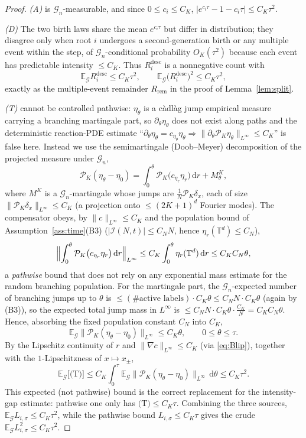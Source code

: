 \documentclass[a4paper,fleqn]{cas-sc}
\theoremstyle{definition}
\theoremstyle{remark}
\begin{document}
\begin{proof}
\emph{(A)} is $\mathcal G_n$-measurable, and since $0\le c_i\le C_K$,
$\bigl|e^{c_i\tau}-1-c_i\tau\bigr|\le C_K\tau^2$.

\emph{(D)} The two birth laws share the mean $e^{c_i\tau}$ but differ in
distribution; they disagree only when root $i$ undergoes a second-generation birth
or any multiple event within the step, of $\mathcal G_n$-conditional probability
$O_K(\tau^2)$ because each event has predictable intensity $\le C_K$. Thus
$R^{\mathrm{desc}}_i$ is a nonnegative count with
\[
\mathbb E_{\mathcal G}R^{\mathrm{desc}}_i\le C_K\tau^2,
\qquad
\mathbb E_{\mathcal G}\bigl(R^{\mathrm{desc}}_i\bigr)^2\le C_K\tau^2,
\]
exactly as the multiple-event remainder $R_{\mathrm{rem}}$ in the proof of
Lemma~\ref{lem:split}.

\emph{(T)} cannot be controlled pathwise: $\eta_\theta$ is a c\`adl\`ag jump
empirical measure carrying a branching martingale part, so $\partial_\theta\eta_\theta$
does not exist along paths and the deterministic reaction-PDE estimate
``$\partial_\theta\eta_\theta=c_{\eta_\theta}\eta_\theta\Rightarrow
\|\partial_\theta\mathcal P_K\eta_\theta\|_{L^\infty}\le C_K$'' is false here.
Instead we use the semimartingale (Doob--Meyer) decomposition of the projected
measure under $\mathcal G_n$,
\[
\mathcal P_K(\eta_\theta-\eta_0)
=\int_0^\theta\mathcal P_K\bigl(c_{\eta_r}\eta_r\bigr)\,\mathrm dr+M^K_\theta,
\]
where $M^K$ is a $\mathcal G_n$-martingale whose jumps are $\frac1N\mathcal P_K\delta_x$,
each of size $\|\mathcal P_K\delta_x\|_{L^\infty}\le C_K$ (a projection onto
$\le(2K+1)^d$ Fourier modes). The compensator obeys, by $\|c\|_{L^\infty}\le C_K$
and the population bound of Assumption~\ref{ass:time}(B3)
($|\mathcal I(N,t)|\le C_NN$, hence $\eta_r(\mathbb T^d)\le C_N$),
\[
\Bigl\|\int_0^\theta\mathcal P_K\bigl(c_{\eta_r}\eta_r\bigr)\,\mathrm dr\Bigr\|_{L^\infty}
\le C_K\int_0^\theta\eta_r(\mathbb T^d)\,\mathrm dr\le C_KC_N\theta,
\]
a \emph{pathwise} bound that does not rely on any exponential mass estimate for the
random branching population. For the martingale part, the $\mathcal G_n$-expected
number of branching jumps up to $\theta$ is
$\le(\#\text{active labels})\cdot C_K\theta\le C_NN\cdot C_K\theta$ (again by (B3)),
so the expected total jump mass in $L^\infty$ is
$\le C_NN\cdot C_K\theta\cdot\frac{C_K}{N}=C_KC_N\theta$. Hence, absorbing the
fixed population constant $C_N$ into $C_K$,
\[
\mathbb E_{\mathcal G}\bigl\|\mathcal P_K(\eta_\theta-\eta_0)\bigr\|_{L^\infty}\le C_K\theta,
\qquad 0\le\theta\le\tau.
\]
By the Lipschitz continuity of $r$ and $\|\nabla c\|_{L^\infty}\le C_K$
(via \eqref{eq:Blip}), together with the $1$-Lipschitzness of $x\mapsto x_\pm$,
\[
\mathbb E_{\mathcal G}\bigl[\text{(T)}\bigr]
\le C_K\int_0^\tau\mathbb E_{\mathcal G}\bigl\|\mathcal P_K(\eta_\theta-\eta_0)\bigr\|_{L^\infty}\,\mathrm d\theta
\le C_K\tau^2 .
\]
This expected (not pathwise) bound is the correct replacement for the
intensity-gap estimate: pathwise one only has $\text{(T)}\le C_K\tau$. Combining
the three sources, $\mathbb E_{\mathcal G}L_{i,\sigma}\le C_K\tau^2$, while the
pathwise bound $L_{i,\sigma}\le C_K\tau$ gives the crude
$\mathbb E_{\mathcal G}L_{i,\sigma}^2\le C_K\tau^2$.


\end{proof}
\end{document}

